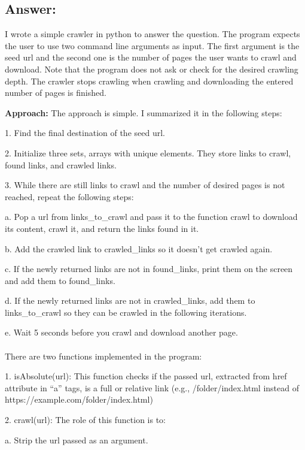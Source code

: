 \documentclass[a4paper, 11pt]{article}
\begin{document}
\subsection*{Answer:}
I wrote a simple crawler in python to answer the question. The program expects the user to use two command line arguments as input. The first argument is the seed url and the second one is the number of pages the user wants to crawl and download. Note that the program does not ask or check for the desired crawling depth. The crawler stops crawling when crawling and downloading the entered number of pages is finished.

\textbf{Approach:}
The approach is simple. I summarized it in the following steps:

1. Find the final destination of the seed url.

2. Initialize three sets, arrays with unique elements. They store links to crawl, found links, and crawled links.

3. While there are still links to crawl and the number of desired pages is not reached, repeat the following steps:

a. Pop a url from links\_to\_crawl and pass it to the function crawl to download its content, crawl it, and return the links found in it.

b. Add the crawled link to crawled\_links so it doesn't get crawled again.

c. If the newly returned links are not in found\_links, print them on the screen and add them to found\_links.

d. If the newly returned links are not in crawled\_links, add them to links\_to\_crawl so they can be crawled in the following iterations. 

e. Wait 5 seconds before you crawl and download another page.

\paragraph{}

There are two functions implemented in the program:

1. isAbsolute(url):
This function checks if the passed url, extracted from href attribute in ``a'' tags, is a full or relative link (e.g., /folder/index.html instead of https://example.com/folder/index.html)

2. crawl(url):
The role of this function is to:

a. Strip the url passed as an argument.
\end{document}
